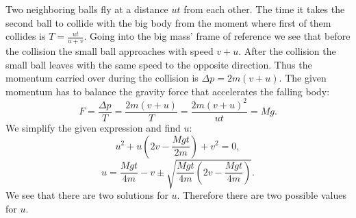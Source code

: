 {\ifEngSolution
Two neighboring balls fly at a distance $u t$ from each other. The time it takes the second ball to collide with the big body from the moment where first of them collides is $T=\frac{u t}{u+v}$. Going into the big mass’ frame of reference we see that before the collision the small ball approaches with speed $v + u$. After the collision the small ball leaves with the same speed to the opposite direction. Thus the momentum carried over during the collision is $\Delta p = 2m(v + u)$. The given momentum has to balance the gravity force that accelerates the falling body:
\[ F=\frac{\Delta p}{T}=\frac{2m(v + u)}{T} = \frac{2m(v + u)^2}{ut}=Mg. \] 
We simplify the given expression and find $u$:
\[
u^2 + u\left( 2v - \frac{Mgt}{2m}\right) + v^2 = 0,
\] 
\[
u = \frac{Mgt}{4m} - v \pm \sqrt{\frac{Mgt}{4m}\left( 2v - \frac{Mgt}{4m}\right)}.
\]
We see that there are two solutions for $u$. Therefore there are two possible values for $u$.
\fi
}